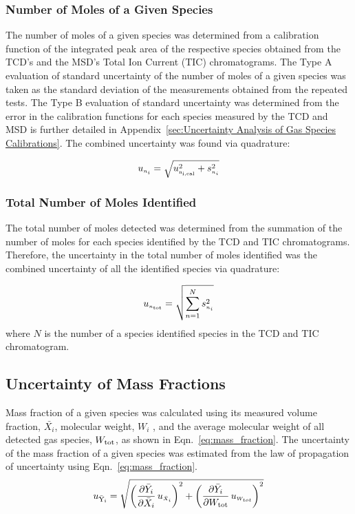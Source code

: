 \documentclass[12pt]{article}
\begin{document}
\subsubsection{Number of Moles of a Given Species}
\label{ssec:Number_of_Moles_of_a_Given_Species}

The number of moles of a given species was determined from a calibration function of the integrated peak area of the respective species obtained from the TCD's and the MSD's Total Ion Current (TIC) chromatograms. The Type A evaluation of standard uncertainty of the number of moles of a given species was taken as the standard deviation of the measurements obtained from the repeated tests. The Type B evaluation of standard uncertainty was determined from the error in the calibration functions for each species measured by the TCD and MSD is further detailed in Appendix~\ref{sec:Uncertainty Analysis of Gas Species Calibrations}. The combined uncertainty was found via quadrature:

\begin{equation}
\label{eq:gasspeciesuncertaintycertainty}
u_{\scriptscriptstyle n_{i}} = \sqrt{ u_{\rm \scriptscriptstyle n_{i,\rm cal}}^2 + s_{\scriptscriptstyle n_{i}}^2}
\end{equation}

\subsubsection{Total Number of Moles Identified}
\label{ssec:Total Number of Moles Identified}
The total number of moles detected was determined from the summation of the number of moles for each species identified by the TCD and TIC chromatograms. Therefore, the uncertainty in the total number of moles identified was the combined uncertainty of all the identified species via quadrature:

\begin{equation}
\label{eq:totalnumberofmolesdetected}
u_{\scriptscriptstyle n_{\rm tot}}=\sqrt{{\sum_{n=1}^{N} s_{\scriptscriptstyle n_{i}}^2}}
\end{equation}
where $N$ is the number of a species identified species in the TCD and TIC chromatogram.

\subsection{Uncertainty of Mass Fractions}
\label{ssec:Uncertainty of Mass Fractions}
Mass fraction of a given species was calculated using its measured volume fraction, $\bar{X_{i}}$, molecular weight, $W_i$ , and the average molecular weight of all detected gas species, $W_{\rm tot}$, as shown in Eqn.~\ref{eq:mass_fraction}. The uncertainty of the mass fraction of a given species was estimated from the law of propagation of uncertainty using Eqn.~\ref{eq:mass_fraction}.
\begin{equation}\label{eq:Mass_Frac_Uncertainty}
u_\mathrm{\bar{Y}_{i}} = \sqrt{{\left( \frac{\partial \bar{Y}_{i}}{\partial \bar{X}_{i}}\,u_{\scriptscriptstyle \bar{X}_{i}} \right)}^2+{\left(\frac{\partial \bar{Y}_{i}}{\partial W_{\rm tot}}\,u_{\scriptscriptstyle W_{tot}}\right)}^2}
\end{equation}
\end{document}
